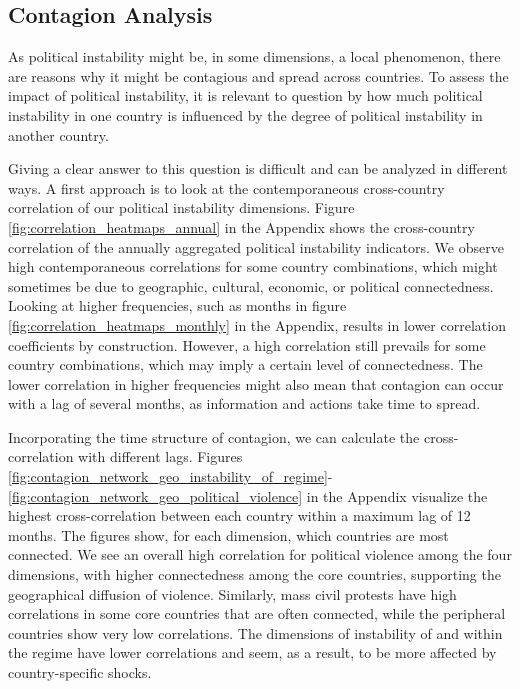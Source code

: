 \documentclass[12pt,a4paper,fleqn]{article}
\begin{document}
\subsection{Contagion Analysis}

As political instability might be, in some dimensions, a local phenomenon, there are reasons why it might be contagious and spread across countries. To assess the impact of political instability, it is relevant to question by how much political instability in one country is influenced by the degree of political instability in another country.

Giving a clear answer to this question is difficult and can be analyzed in different ways. A first approach is to look at the contemporaneous cross-country correlation of our political instability dimensions. Figure \ref{fig:correlation_heatmaps_annual} in the Appendix shows the cross-country correlation of the annually aggregated political instability indicators. We observe high contemporaneous correlations for some country combinations, which might sometimes be due to geographic, cultural, economic, or political connectedness. Looking at higher frequencies, such as months in figure \ref{fig:correlation_heatmaps_monthly} in the Appendix, results in lower correlation coefficients by construction. However, a high correlation still prevails for some country combinations, which may imply a certain level of connectedness. The lower correlation in higher frequencies might also mean that contagion can occur with a lag of several months, as information and actions take time to spread.

Incorporating the time structure of contagion, we can calculate the cross-correlation with different lags. Figures \ref{fig:contagion_network_geo_instability_of_regime}-\ref{fig:contagion_network_geo_political_violence} in the Appendix visualize the highest cross-correlation between each country within a maximum lag of 12 months. The figures show, for each dimension, which countries are most connected. We see an overall high correlation for political violence among the four dimensions, with higher connectedness among the core countries, supporting the geographical diffusion of violence. Similarly, mass civil protests have high correlations in some core countries that are often connected, while the peripheral countries show very low correlations. The dimensions of instability of and within the regime have lower correlations and seem, as a result, to be more affected by country-specific shocks.
\end{document}

